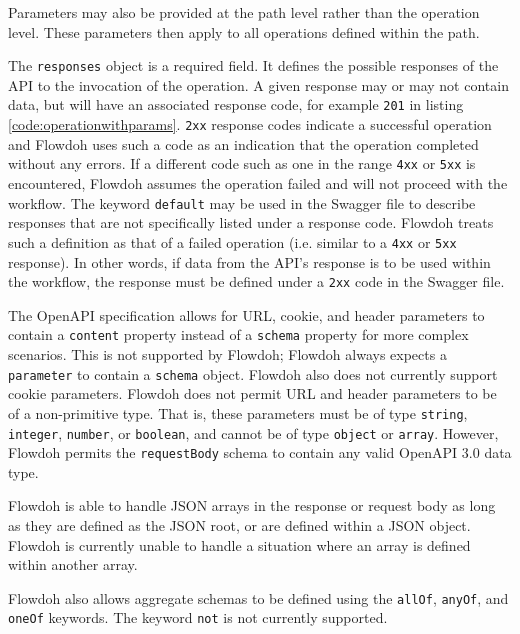 Parameters may also be provided at the path level rather than the operation level. These parameters then apply to all operations defined within the path.

The \texttt{responses} object is a required field. It defines the possible responses of the API to the invocation of the operation. A given response may or may not contain data, but will have an associated response code, for example \texttt{201} in listing \ref{code:operationwithparams}. \texttt{2xx} response codes indicate a successful operation and Flowdoh uses such a code as an indication that the operation completed without any errors. If a different code such as one in the range \texttt{4xx} or \texttt{5xx} is encountered, Flowdoh assumes the operation failed and will not proceed with the workflow. The keyword \texttt{default} may be used in the Swagger file to describe responses that are not specifically listed under a response code. Flowdoh treats such a definition as that of a failed operation (i.e. similar to a \texttt{4xx} or \texttt{5xx} response). In other words, if data from the API's response is to be used within the workflow, the response must be defined under a \texttt{2xx} code in the Swagger file.

The OpenAPI specification allows for URL, cookie, and header parameters to contain a \texttt{content} property instead of a \texttt{schema} property for more complex scenarios\cite{parameters}. This is not supported by Flowdoh; Flowdoh always expects a \texttt{parameter} to contain a \texttt{schema} object. Flowdoh also does not currently support cookie parameters. Flowdoh does not permit URL and header parameters to be of a non-primitive type. That is, these parameters must be of type \texttt{string}, \texttt{integer}, \texttt{number}, or \texttt{boolean}, and cannot be of type \texttt{object} or \texttt{array}. However, Flowdoh permits the \texttt{requestBody} schema to contain any valid OpenAPI 3.0 data type.

Flowdoh is able to handle JSON arrays in the response or request body as long as they are defined as the JSON root, or are defined within a JSON object. Flowdoh is currently unable to handle a situation where an array is defined within another array.

Flowdoh also allows aggregate schemas to be defined using the \texttt{allOf}, \texttt{anyOf}, and \texttt{oneOf} keywords\cite{aggregateschemas}. The keyword \texttt{not} is not currently supported.

